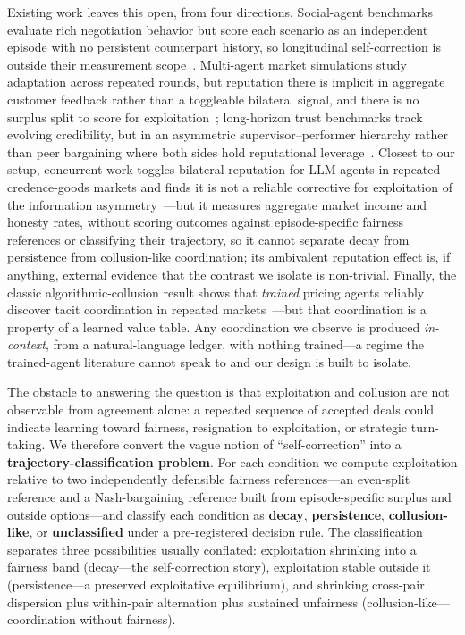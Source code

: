 \documentclass[conference]{IEEEtran}
\begin{document}
Existing work leaves this open, from four directions. Social-agent benchmarks
evaluate rich negotiation behavior but score each scenario as an independent
episode with no persistent counterpart history, so longitudinal
self-correction is outside their measurement scope~\cite{sotopia}. Multi-agent
market simulations study adaptation across repeated rounds, but reputation
there is implicit in aggregate customer feedback rather than a toggleable
bilateral signal, and there is no surplus split to score for
exploitation~\cite{competeai}; long-horizon trust benchmarks track evolving
credibility, but in an asymmetric supervisor--performer hierarchy rather than
peer bargaining where both sides hold reputational
leverage~\cite{lhdeception}. Closest to our setup, concurrent work toggles
bilateral reputation for LLM agents in repeated credence-goods markets and
finds it is not a reliable corrective for exploitation of the information
asymmetry~\cite{erlei2026llmmarkets}---but it measures aggregate market income
and honesty rates, without scoring outcomes against episode-specific fairness
references or classifying their trajectory, so it cannot separate decay from
persistence from collusion-like coordination; its ambivalent reputation effect
is, if anything, external evidence that the contrast we isolate is
non-trivial. Finally, the classic algorithmic-collusion result shows that
\emph{trained} pricing agents reliably discover tacit coordination in repeated
markets~\cite{calvano2020}---but that coordination is a property of a learned
value table. Any coordination we observe is produced \emph{in-context}, from a
natural-language ledger, with nothing trained---a regime the trained-agent
literature cannot speak to and our design is built to isolate.

The obstacle to answering the question is that exploitation and collusion are
not observable from agreement alone: a repeated sequence of accepted deals
could indicate learning toward fairness, resignation to exploitation, or
strategic turn-taking. We therefore convert the vague notion of
``self-correction'' into a \textbf{trajectory-classification problem}. For
each condition we compute exploitation relative to two independently
defensible fairness references---an even-split reference and a Nash-bargaining
reference built from episode-specific surplus and outside options---and
classify each condition as \textbf{decay}, \textbf{persistence},
\textbf{collusion-like}, or \textbf{unclassified} under a pre-registered
decision rule. The classification separates three possibilities usually
conflated: exploitation shrinking into a fairness band (decay---the
self-correction story), exploitation stable outside it (persistence---a
preserved exploitative equilibrium), and shrinking cross-pair dispersion plus
within-pair alternation plus sustained unfairness (collusion-like---
coordination without fairness).
\end{document}
